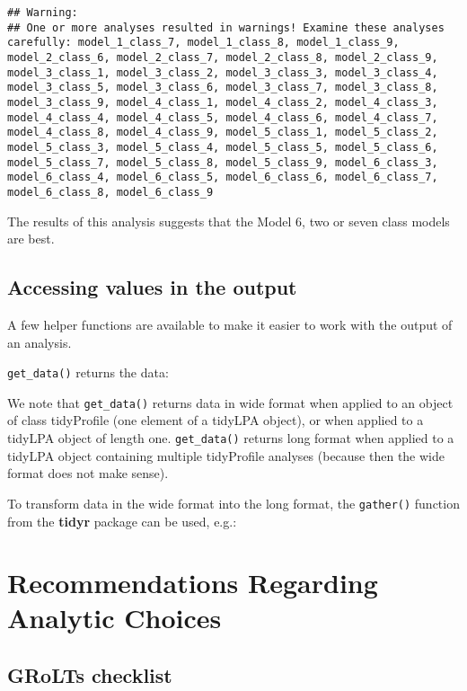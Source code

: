 \documentclass[man]{apa6}
\begin{document}
\begin{verbatim}
## Warning: 
## One or more analyses resulted in warnings! Examine these analyses carefully: model_1_class_7, model_1_class_8, model_1_class_9, model_2_class_6, model_2_class_7, model_2_class_8, model_2_class_9, model_3_class_1, model_3_class_2, model_3_class_3, model_3_class_4, model_3_class_5, model_3_class_6, model_3_class_7, model_3_class_8, model_3_class_9, model_4_class_1, model_4_class_2, model_4_class_3, model_4_class_4, model_4_class_5, model_4_class_6, model_4_class_7, model_4_class_8, model_4_class_9, model_5_class_1, model_5_class_2, model_5_class_3, model_5_class_4, model_5_class_5, model_5_class_6, model_5_class_7, model_5_class_8, model_5_class_9, model_6_class_3, model_6_class_4, model_6_class_5, model_6_class_6, model_6_class_7, model_6_class_8, model_6_class_9
\end{verbatim}

The results of this analysis suggests that the Model 6, two or seven class models are best.

\hypertarget{accessing-values-in-the-output}{%
\subsection{Accessing values in the output}\label{accessing-values-in-the-output}}

A few helper functions are available to make it easier to work with the output
of an analysis.

\texttt{get\_data()} returns the data:

We note that \texttt{get\_data()} returns data in wide format when applied to an object
of class tidyProfile (one element of a tidyLPA object), or when applied to a
tidyLPA object of length one. \texttt{get\_data()} returns long format when applied to a
tidyLPA object containing multiple tidyProfile analyses (because then the wide
format does not make sense).

To transform data in the wide format into the long format, the \texttt{gather()}
function from the \textbf{tidyr} package can be used, e.g.:

\hypertarget{recommendations-regarding-analytic-choices}{%
\section{Recommendations Regarding Analytic Choices}\label{recommendations-regarding-analytic-choices}}

\hypertarget{grolts-checklist}{%
\subsection{GRoLTs checklist}\label{grolts-checklist}}
\end{document}
